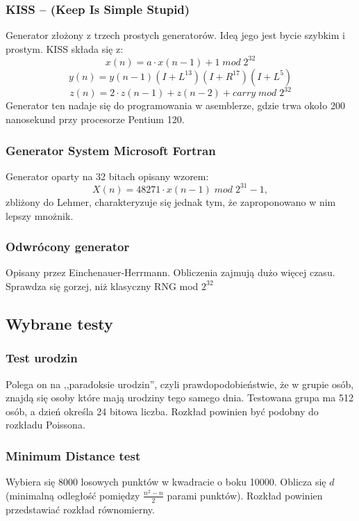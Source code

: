 \documentclass[11pt]{aghdpl}
\begin{document}
\subsubsection{KISS – (Keep Is Simple Stupid)}
Generator złożony z trzech prostych generatorów. Ideą jego jest bycie szybkim i prostym. KISS składa się z:
\begin{equation}
x(n) = a \cdot x (n-1)+1 \; mod \; 2^{32}
\end{equation}
\begin{equation}
y(n)=y(n-1)(I+L^{13})(I+R^{17})(I+L^5)
\end{equation}
\begin{equation}
z(n)=2 \cdot z(n-1)+z(n-2) +carry \; mod \; 2^{32}
\end{equation}
Generator ten nadaje się do programowania w asemblerze, gdzie trwa około 200 nanosekund przy procesorze Pentium 120.
\subsubsection{Generator System Microsoft Fortran}
Generator oparty na 32 bitach opisany wzorem:
\begin{equation}
X ( n ) = 48271 \cdot x (n- 1 )\; mod\; 2 ^ {31}-1,
\end{equation}
zbliżony do Lehmer, charakteryzuje się jednak tym, że zaproponowano w nim lepszy mnożnik. 
\subsubsection{Odwrócony generator}
Opisany przez Einchenauer-Herrmann. Obliczenia zajmują dużo więcej czasu. Sprawdza się gorzej, niż klasyczny RNG mod $2^{32}$
\subsection{Wybrane testy}
\subsubsection{Test urodzin}
Polega on na ,,paradoksie urodzin'', czyli prawdopodobieństwie, że w grupie osób, znajdą się osoby które mają urodziny tego samego dnia. Testowana grupa ma 512 osób, a dzień określa 24 bitowa liczba. Rozkład powinien być podobny do rozkładu Poissona.
\subsubsection{Minimum Distance test}
Wybiera się 8000 losowych punktów w kwadracie o boku 10000. Oblicza się $d$ (minimalną odległość pomiędzy $\frac{n^2 -n}{2}$ parami punktów). Rozkład powinien przedstawiać rozkład równomierny.
\end{document}
